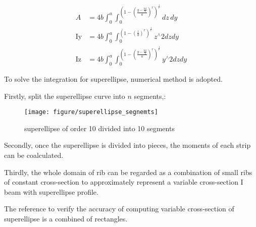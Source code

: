 \begin{equation}
\begin{split}
A &= 4 b \int _0^a\int_0^{\left(1-\left(\frac{y-\frac{\text{b2}}{2}}{a}\right)^r\right)^{\frac{1}{r}}} dz \, dy \\
\text{Iy} &= 4 b \int _0^a\int _0^{\left(1-\left(\frac{z}{b}\right)^r\right)^{\frac{1}{r}}}z{}^{\wedge}2 dzdy \\
\text{Iz} &= 4 b \int _0^a\int _0^{\left(1-\left(\frac{y-\frac{\text{b2}}{2}}{a}\right)^r\right)^{\frac{1}{r}}}y{}^{\wedge}2dzdy
\end{split}
\end{equation}

To solve the integration for superellipse, numerical method is adopted.

Firstly, split the superellipse curve into $ n $ segments,:

\begin{figure}[h!]
\centering
\texttt{[image: figure/superellipse\_segnemts]}
\caption{superellipse of order 10 divided into 10 segments}
\label{fig:superellipsesegnemts}
\end{figure}

Secondly, once the superellipse is divided into pieces, the moments of each strip can be coalculated.

Thirdly, the whole domain of rib can be regarded as a combination of small ribs of constant cross-section to approximately represent a variable cross-section I beam with superellipse profile. 

The reference to verify the accuracy of computing variable cross-section of superellipse is a combined of rectangles.